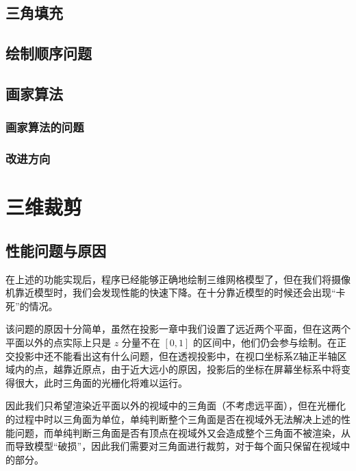 \documentclass[12pt,oneside,a4paper]{ctexart}
\begin{document}
\subsection{三角填充}
\subsection{绘制顺序问题}
\subsection{画家算法}
\subsubsection{画家算法的问题}
\subsubsection{改进方向}
\newpage
\section{三维裁剪}
\subsection{性能问题与原因}
在上述的功能实现后，程序已经能够正确地绘制三维网格模型了，但在我们将摄像机靠近模型时，我们会发现性能的快速下降。在十分靠近模型的时候还会出现“卡死”的情况。

该问题的原因十分简单，虽然在投影一章中我们设置了远近两个平面，但在这两个平面以外的点实际上只是 $z$ 分量不在 $[0,1]$ 的区间中，他们仍会参与绘制。在正交投影中还不能看出这有什么问题，但在透视投影中，在视口坐标系Z轴正半轴区域内的点，越靠近原点，由于近大远小的原因，投影后的坐标在屏幕坐标系中将变得很大，此时三角面的光栅化将难以运行。

因此我们只希望渲染近平面以外的视域中的三角面（不考虑远平面），但在光栅化的过程中时以三角面为单位，单纯判断整个三角面是否在视域外无法解决上述的性能问题，而单纯判断三角面是否有顶点在视域外又会造成整个三角面不被渲染，从而导致模型“破损”，因此我们需要对三角面进行裁剪，对于每个面只保留在视域中的部分。
\end{document}
